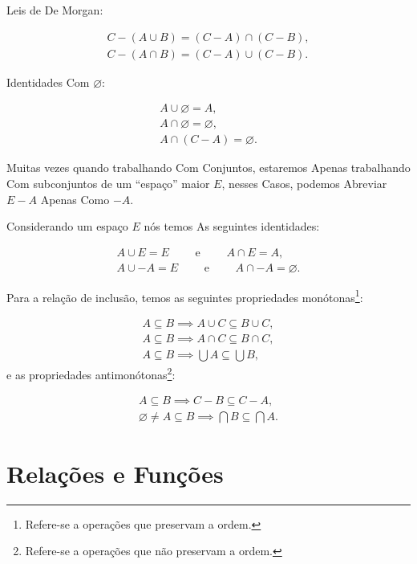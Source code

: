 Leis de De Morgan:

\begin{align*}
    C - (A \cup B) = (C - A) \cap (C - B), \\
    C - (A \cap B) = (C - A) \cup (C - B).
\end{align*}

Identidades Com \(\varnothing\):

\begin{align*}
    A \cup \varnothing = A,           \\
    A \cap \varnothing = \varnothing, \\
    A \cap (C - A) = \varnothing.
\end{align*}

\begin{remark}
    Muitas vezes quando trabalhando Com Conjuntos, estaremos Apenas trabalhando Com subconjuntos de um ``espaço''  maior \(E\), nesses Casos, podemos Abreviar \(E - A\) Apenas Como \(-A\).
\end{remark}

Considerando um espaço \(E\) nós temos As seguintes identidades:

\begin{align*}
    A \cup E = E \qquad \text{ e } \qquad A \cap E = A, \\
    A \cup -A = E \qquad \text{ e } \qquad A \cap -A = \varnothing.
\end{align*}

Para a relação de inclusão, temos as seguintes propriedades monótonas\footnote{Refere-se a operações que preservam a ordem.}:

\begin{align*}
    A \subseteq B \implies A \cup C \subseteq B \cup C, \\
    A \subseteq B \implies A \cap C \subseteq B \cap C, \\
    A \subseteq B \implies \bigcup A \subseteq \bigcup B,
\end{align*}
e as propriedades antimonótonas\footnote{Refere-se a operações que não preservam a ordem.}:

\begin{align*}
    A \subseteq B \implies C - B \subseteq C - A, \\
    \varnothing \neq A \subseteq B \implies \bigcap B \subseteq \bigcap A.
\end{align*}

\section{Relações e Funções}
\label{sec:relacoes_funcoes}

